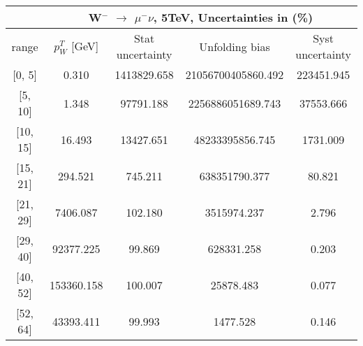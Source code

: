 \documentclass[12pt]{article}
\begin{document}
 
\begin{table}[] 
\begin{tabular}{c|c|c|c|c|}
\cline{2-5}
& \multicolumn{4}{c|}{W$^{-}$ $\rightarrow$ $\mu ^{-} \nu $, 5TeV, Uncertainties in (\%)}  \\ \hline \hline 
\multicolumn{1}{|c|}{  range } & $p^{T}_{W}$ [GeV]     & Stat uncertainty     & Unfolding bias     & Syst uncertainty        \\ \hline \hline 
\multicolumn{1}{|c|}{{[}0,  5{]}}  & 0.310 & 1413829.658 & 21056700405860.492 & 223451.945 \\ \hline 
\multicolumn{1}{|c|}{{[}5,  10{]}}  & 1.348 & 97791.188 & 2256886051689.743 & 37553.666 \\ \hline 
\multicolumn{1}{|c|}{{[}10,  15{]}}  & 16.493 & 13427.651 & 48233395856.745 & 1731.009 \\ \hline 
\multicolumn{1}{|c|}{{[}15,  21{]}}  & 294.521 & 745.211 & 638351790.377 & 80.821 \\ \hline 
\multicolumn{1}{|c|}{{[}21,  29{]}}  & 7406.087 & 102.180 & 3515974.237 & 2.796 \\ \hline 
\multicolumn{1}{|c|}{{[}29,  40{]}}  & 92377.225 & 99.869 & 628331.258 & 0.203 \\ \hline 
\multicolumn{1}{|c|}{{[}40,  52{]}}  & 153360.158 & 100.007 & 25878.483 & 0.077 \\ \hline 
\multicolumn{1}{|c|}{{[}52,  64{]}}  & 43393.411 & 99.993 & 1477.528 & 0.146 \\ \hline 
\end{tabular}
\end{table}
\end{document}
